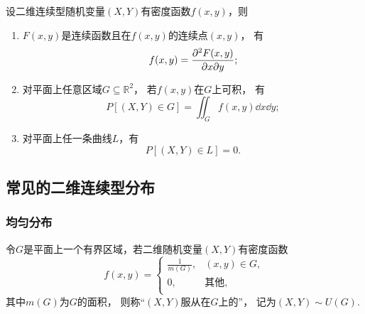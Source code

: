 \begin{theorem}
设二维连续型随机变量\((X,Y)\)有密度函数\(f(x,y)\)，则
\begin{enumerate}
	\item \(F(x,y)\)是连续函数且在\(f(x,y)\)的连续点\((x,y)\)，
	有\[
		f(x,y) = \pdv{F(x,y)}{x}{y};
	\]

	\item 对平面上任意区域\(G \subseteq \mathbb{R}^2\)，
	若\(f(x,y)\)在\(G\)上可积，
	有\[
		P\left[(X,Y) \in G\right] = \iint_G{f(x,y) \dd{x}\dd{y}};
	\]

	\item 对平面上任一条曲线\(L\)，有\[
		P\left[(X,Y) \in L\right] = 0.
	\]
\end{enumerate}
\end{theorem}

\subsection{常见的二维连续型分布}
\subsubsection{均匀分布}
\begin{definition}
令\(G\)是平面上一个有界区域，若二维随机变量\((X,Y)\)有密度函数\[
	f(x,y) = \left\{ \begin{array}{ll}
		\frac{1}{m(G)}, & (x,y) \in G, \\
		0, & \text{其他}, \\
	\end{array} \right.
\]
其中\(m(G)\)为\(G\)的面积，
则称“\((X,Y)\)服从在\(G\)上的”，
记为\((X,Y) \sim U(G)\).
\end{definition}

